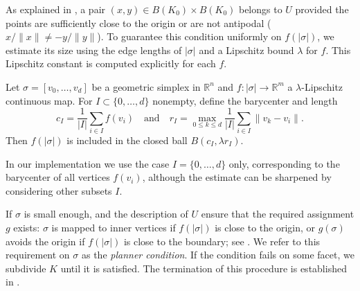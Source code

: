 \documentclass[a4paper,english,cleveref,autoref,thm-restate,nolineno]{socg-lipics-v2021}
\newcommand{\R}{\mathbb R}
\newcommand{\geomreal}[1] { |#1| } %
\newif\iffullversion
\newcommand{\fullonly}[1]{\iffullversion #1\fi}
\newcommand{\shortonly}[1]{\iffullversion\else #1\fi}
\begin{document}
As explained in , a pair $(x,y) \in B(K_0) \times B(K_0)$ belongs to $U$ provided the points are sufficiently close to the origin or are not antipodal ($x/\|x\|\neq -y/\|y\|$).
To guarantee this condition uniformly on $f(\geomreal{\sigma})$, we estimate its size using the edge lengths of $\geomreal{\sigma}$ and a Lipschitz bound $\lambda$ for $f$.
This Lipschitz constant is computed explicitly for each $f$.

\fullonly{
\begin{lemma}[%
	name={proof p.~\pageref{proof:lipschitz_deformation_simplices}},%
	restate=lipschitzdeformationsimplices%
	]
	\label{lem:lipschitz_deformation_simplices}
	Let $\sigma = [v_0,\dots,v_d]$ be a geometric simplex in $\R^n$ and $f\colon\geomreal{\sigma} \to \R^m$ a $\lambda$-Lipschitz continuous map.
	For $I\subset\{0,\dots,d \}$ nonempty, define the barycenter and length
	\[
	c_I = \frac{1}{|I|}\sum_{i\in I} f(v_i)
	\quad
	\text{and}
	\quad
	r_I = \max_{0\leq k \leq d } \frac{1}{|I|}\sum_{i\in I}\|v_k-v_i\|.
	\]
	Then $f(\geomreal{\sigma})$ is included in the closed ball $B(c_I, \lambda r_I)$.
\end{lemma}
}

\shortonly{
\begin{lemma}
	\label{lem:lipschitz_deformation_simplices}
	Let $\sigma = [v_0,\dots,v_d]$ be a geometric simplex in $\R^n$ and $f\colon\geomreal{\sigma} \to \R^m$ a $\lambda$-Lipschitz continuous map.
	For $I\subset\{0,\dots,d \}$ nonempty, define the barycenter and length
	\[
	c_I = \frac{1}{|I|}\sum_{i\in I} f(v_i)
	\quad
	\text{and}
	\quad
	r_I = \max_{0\leq k \leq d } \frac{1}{|I|}\sum_{i\in I}\|v_k-v_i\|.
	\]
	Then $f(\geomreal{\sigma})$ is included in the closed ball $B(c_I, \lambda r_I)$.
\end{lemma}
}

In our implementation we use the case $I = \{0,\dots,d \}$ only, corresponding to the barycenter of all vertices $f(v_i)$, although the estimate can be sharpened by considering other subsets $I$.

If $\sigma$ is small enough,  and the description of $U$ ensure that the required assignment $g$ exists: $\sigma$ is mapped to inner vertices if $f(\geomreal{\sigma})$ is close to the origin, or $g(\sigma)$ avoids the origin if $f(\geomreal{\sigma})$ is close to the boundary; see .
We refer to this requirement on $\sigma$ as the \emph{planner condition}. 
If the condition fails on some facet, we subdivide $K$ until it is satisfied.
The termination of this procedure is established in .
\end{document}
